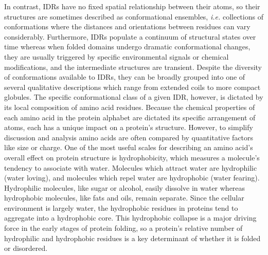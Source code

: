In contrast, IDRs have no fixed spatial relationship between their atoms, so their structures are sometimes described as conformational ensembles, \textit{i.e.} collections of conformations where the distances and orientations between residues can vary considerably. Furthermore, IDRs populate a continuum of structural states over time whereas when folded domains undergo dramatic conformational changes, they are usually triggered by specific environmental signals or chemical modifications, and the intermediate structures are transient. Despite the diversity of conformations available to IDRs, they can be broadly grouped into one of several qualitative descriptions which range from extended coils to more compact globules. The specific conformational class of a given IDR, however, is dictated by its local composition of amino acid residues. Because the chemical properties of each amino acid in the protein alphabet are dictated its specific arrangement of atoms, each has a unique impact on a protein's structure. However, to simplify discussion and analysis amino acids are often compared by quantitative factors like size or charge. One of the most useful scales for describing an amino acid's overall effect on protein structure is hydrophobicity, which measures a molecule's tendency to associate with water. Molecules which attract water are hydrophilic (water loving), and molecules which repel water are hydrophobic (water fearing). Hydrophilic molecules, like sugar or alcohol, easily dissolve in water whereas hydrophobic molecules, like fats and oils, remain separate. Since the cellular environment is largely water, the hydrophobic residues in proteins tend to aggregate into a hydrophobic core. This hydrophobic collapse is a major driving force in the early stages of protein folding, so a protein's relative number of hydrophilic and hydrophobic residues is a key determinant of whether it is folded or disordered.

